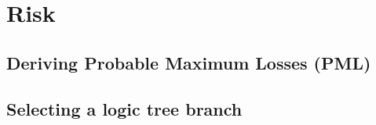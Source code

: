 \chapter{Risk}
\label{chap:risk}


	\section{Deriving Probable Maximum Losses (PML)}
	\label{sec:derive-pml}
	

	\section{Selecting a logic tree branch}
	\label{sec:logic-tree}
	